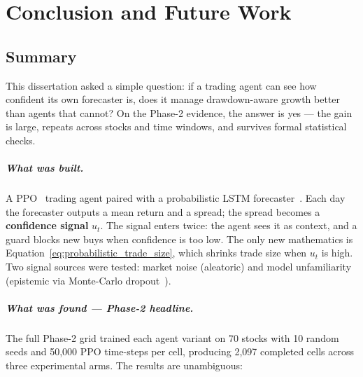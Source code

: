 \chapter{Conclusion and Future Work}
\label{ch:conclusion}

\section{Summary}
\label{sec:summary}

This dissertation asked a simple question: if a trading agent can see how confident its own forecaster is, does it manage drawdown-aware growth better than agents that cannot? On the Phase-2 evidence, the answer is yes --- the gain is large, repeats across stocks and time windows, and survives formal statistical checks.

\paragraph{What was built.} A PPO~\parencite{schulman2017ppo} trading agent paired with a probabilistic LSTM forecaster~\parencite{hochreiter1997lstm,salinas2020deepar}. Each day the forecaster outputs a mean return and a spread; the spread becomes a \textbf{confidence signal} $u_t$. The signal enters twice: the agent sees it as context, and a guard blocks new buys when confidence is too low. The only new mathematics is Equation~\ref{eq:probabilistic_trade_size}, which shrinks trade size when $u_t$ is high. Two signal sources were tested: market noise (aleatoric) and model unfamiliarity (epistemic via Monte-Carlo dropout~\parencite{gal2016dropout}).

\paragraph{What was found --- Phase-2 headline.} The full Phase-2 grid trained each agent variant on 70 stocks with 10 random seeds and 50,000 PPO time-steps per cell, producing 2,097 completed cells across three experimental arms. The results are unambiguous:

